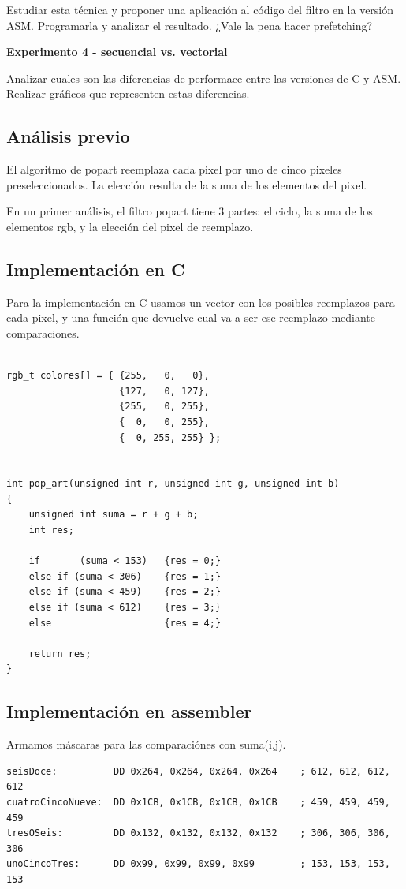   \vspace*{0.2cm}
  Estudiar esta técnica y proponer una aplicación al código del filtro en la versión ASM.
  Programarla y analizar el resultado. ¿Vale la pena hacer prefetching?

\vspace*{0.3cm} \noindent
\textbf{Experimento 4 - secuencial vs. vectorial}

  Analizar cuales son las diferencias de performace entre las versiones de C y ASM. 
  Realizar gráficos que representen estas diferencias.


\subsection{An\'alisis previo}
El algoritmo de popart reemplaza cada pixel por uno de cinco pixeles preseleccionados. 
La elecci\'on resulta de la suma de los elementos del pixel.

En un primer an\'alisis, el filtro popart tiene 3 partes: el ciclo, la suma de los elementos rgb, y la elecci\'on del pixel de reemplazo.

\subsection{Implementaci\'on en C}
Para la implementaci\'on en C usamos un vector con los posibles reemplazos para cada pixel, 
y una funci\'on que devuelve cual va a ser ese reemplazo mediante comparaciones.
\begin{codesnippet}
\begin{verbatim}

rgb_t colores[] = { {255,   0,   0},
                    {127,   0, 127},
                    {255,   0, 255},
                    {  0,   0, 255},
                    {  0, 255, 255} };

			
int pop_art(unsigned int r, unsigned int g, unsigned int b)
{
    unsigned int suma = r + g + b;
    int res;
	
    if 		 (suma < 153)	{res = 0;}
    else if (suma < 306)	{res = 1;}
    else if (suma < 459)	{res = 2;}
    else if (suma < 612)	{res = 3;}
    else 					{res = 4;}
	
    return res;
}
\end{verbatim}
\end{codesnippet}

\subsection{Implementaci\'on en assembler}
Armamos máscaras para las comparaci\'ones con suma(i,j).
\begin{codesnippet}
\begin{verbatim}
seisDoce:          DD 0x264, 0x264, 0x264, 0x264    ; 612, 612, 612, 612			
cuatroCincoNueve:  DD 0x1CB, 0x1CB, 0x1CB, 0x1CB    ; 459, 459, 459, 459	
tresOSeis:         DD 0x132, 0x132, 0x132, 0x132    ; 306, 306, 306, 306	
unoCincoTres:      DD 0x99, 0x99, 0x99, 0x99        ; 153, 153, 153, 153
\end{verbatim}
\end{codesnippet}

